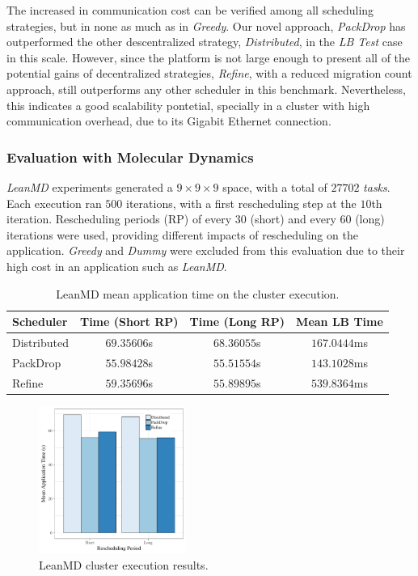 The increased in communication cost can be verified among all scheduling strategies, but in none as much as in \textit{Greedy}.
Our novel approach, \textit{PackDrop} has outperformed the other descentralized strategy, \textit{Distributed}, in the \textit{LB Test} case in this scale.
However, since the platform is not large enough to present all of the potential gains of decentralized strategies, \textit{Refine}, with a reduced migration count approach, still outperforms any other scheduler in this benchmark.
Nevertheless, this indicates a good scalability pontetial, specially in a cluster with high communication overhead, due to its Gigabit Ethernet connection.

\subsubsection{Evaluation with Molecular Dynamics} \label{sec:cluster:md}

\textit{LeanMD} experiments generated a $9\times9\times9$ space, with a total of $27702$ \textit{tasks}.
Each execution ran $500$ iterations, with a first rescheduling step at the $10$th iteration. 
Rescheduling periods (RP) of every $30$ (short) and every $60$ (long) iterations were used, providing different impacts of rescheduling on the application.
\textit{Greedy} and \textit{Dummy} were excluded from this evaluation due to their high cost in an application such as \textit{LeanMD}. 

\begin{table}[!ht]
	\centering
	\caption{LeanMD mean application time on the cluster execution.}	
	\begin{tabular}{l|c c c}
	Scheduler & Time (Short RP) & Time (Long RP) & Mean LB Time \\ \hline
	Distributed & $69.35606$s & $68.36055$s & $167.0444$ms \\ 
	PackDrop & $55.98428$s & $55.51554$s & $143.1028$ms \\ 
	Refine & $59.35696$s & $55.89895$s & $539.8364$ms \\ 
	\end{tabular}
	\label{tab:eval:g5k:leanmd:time} 
\end{table}

\begin{figure}[!ht]
	\centering
    \includegraphics[width=0.43\textwidth]{images/apptime_leanmd_g5k.pdf}
	\caption{LeanMD cluster execution results.}
    \label{fig:eval:g5k:leanmd:time}
\end{figure}


